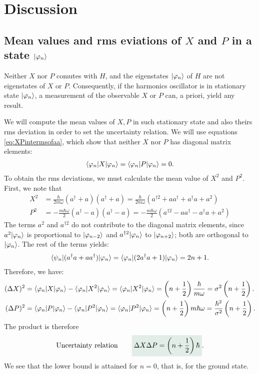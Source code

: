 \section{Discussion}


\subsection{Mean values and rms eviations of $X$ and $P$ in a state $|\varphi_n\rangle$}

Neither $X$ nor $P$ comutes with $H$, and the eigenstates $|\varphi_n\rangle$ of $H$ are not eigenstates of $X$ or $P$. Consequently, if the harmonics oscillator is in stationary state $|\varphi_n\rangle$,
a measurement of the observable $X$ or $P$ can, a priori, yield any result.


We will compute the mean values of $X,P$ in such stationary state and also theirs rms deviation in order to set the uncertainty relation. 
We will use equations \eqref{eq:XPintermsofaa}, which show that neither $X$ nor $P$ has diagonal matrix elements:
\begin{align}
    \langle\varphi_n|X|\varphi_n\rangle=\langle\varphi_n|P|\varphi_n\rangle=0.
\end{align}
To obtain the rms deviations, we must calculate the mean value of $X^2$ and $P^2$. First, we note that 
\begin{align*}
    X^2&=\frac{\hbar}{2m\omega}(a^\dagger+a)(a^\dagger+a)=\frac{\hbar}{2m\omega}(a^{\dagger 2}+aa^\dagger+a^\dagger a+a^2)\\
    P^2&=-\frac{m\hbar\omega}{2}(a^\dagger-a)(a^\dagger-a)=-\frac{m\hbar\omega}{2}(a^{\dagger2}-aa^\dagger-a^\dagger a+a^2)
\end{align*}
The terms $a^2$ and $a^{\dagger2}$ do not contribute to the diagonal matrix elements, since $a^2|\varphi_n\rangle$ is proportional to $|\varphi_{n-2}\rangle$ and 
$a^{\dagger2}|\varphi_n\rangle$ to $|\varphi_{n+2}\rangle$; both are orthogonal to $|\varphi_n\rangle$. The rest of the terms yields:
\begin{align*}
    \langle\psi_n|(a^\dagger a+aa^\dagger)|\varphi_n\rangle=\langle\varphi_n|(2a^\dagger a+1)|\varphi_n\rangle=2n+1.
\end{align*}
Therefore, we have:
\begin{align}
    (\Delta X)^2&=\langle\varphi_n|X|\varphi_n\rangle-\langle\varphi_n|X^2|\varphi_n\rangle=\langle\varphi_n|X^2|\varphi_n\rangle=\left(n+\frac{1}{2}\right)\frac{\hbar}{m\omega}=\sigma^2\left(n+\frac{1}{2}\right).\\
    (\Delta P)^2&=\langle\varphi_n|P|\varphi_n\rangle-\langle\varphi_n|P^2|\varphi_n\rangle=\langle\varphi_n|P^2|\varphi_n\rangle=\left(n+\frac{1}{2}\right)m\hbar\omega=\frac{\hbar^2}{\sigma^2}\left(n+\frac{1}{2}\right).
\end{align}
The product is therefore 
\begin{align}
    \text{Uncertainty relation}\qquad\highlight{\Delta X\Delta P=\left(n+\frac{1}{2}\right)\hbar}.
\end{align}
We see that the lower bound is attained for $n=0$, that is, for the ground state.

